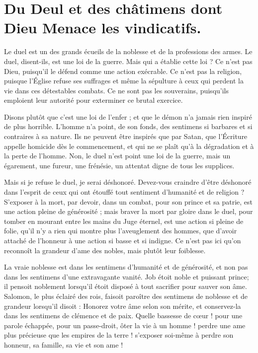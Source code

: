 \documentclass[instructions.tex]{subfiles}
\begin{document}
 
\chapter{Du Deul et des châtimens dont Dieu Menace les vindicatifs.}

\primo Le duel est un des grands écueils de la noblesse et de la professions des armes. Le duel, disent-ils, est une loi de la guerre. Mais qui a établie cette loi ? Ce n'est pas Dieu, puisqu’il le défend comme une action exécrable. Ce n’est pas la religion, puisque l’Église refuse ses suffrages et même la sépulture à ceux qui perdent la vie dans ces détestables combats. Ce ne sont pas les souverains, puisqu’ils emploient leur autorité pour exterminer ce brutal exercice.
 
Disons plutôt que c’est une loi de l’enfer ; et que le démon n’a jamais rien inspiré de plus horrible. L’homme n’a point, de son fonds, des sentimens si barbares et si contraires à sa nature. Ils ne peuvent être inspirés que par Satan, que l’Écriture appelle homicide dès le commencement, et qui ne se plaît qu’à la dégradation et à la perte de l’homme. Non, le duel n’est point une loi de la guerre, mais un égarement, une fureur, une frénésie, un attentat digne de tous les supplices.
 
Mais si je refuse le duel, je serai déshonoré. Devez-vous craindre d’être déshonoré dans l’esprit de ceux qui ont étouffé tout sentiment d’humanité et de religion ? S’exposer à la mort, par devoir, dans un combat, pour son prince et sa patrie, est une action pleine de générosité ; mais braver la mort par gloire dans le duel, pour tomber en mourant entre les mains du Juge éternel, est une action si pleine de folie, qu’il n’y a rien qui montre plus l’aveuglement des hommes, que d’avoir attaché de l’honneur à une action si basse et si indigne. Ce n’est pas ici qu’on reconnoît la grandeur d’ame des nobles, mais plutôt leur foiblesse.
 
La vraie noblesse est dans les sentimens d’humanité et de générosité, et non pas dans les sentimens d’une extravagante vanité. Job étoit noble et puissant prince; il pensoit noblement lorsqu’il étoit disposé à tout sacrifier pour sauver son âme. Salomon, le plus éclairé des rois, faisoit paroître des sentimens de noblesse et de grandeur lorsqu’il disoit : Honorez votre âme selon son mérite, et conservez-la dans les sentimens de clémence et de paix. Quelle bassesse de cœur ! pour une parole échappée, pour un passe-droit, ôter la vie à un homme ! perdre une ame plus précieuse que les empires de la terre ! s’exposer soi-même à perdre son honneur, sa famille, sa vie et son ame !
 
\end{document}

